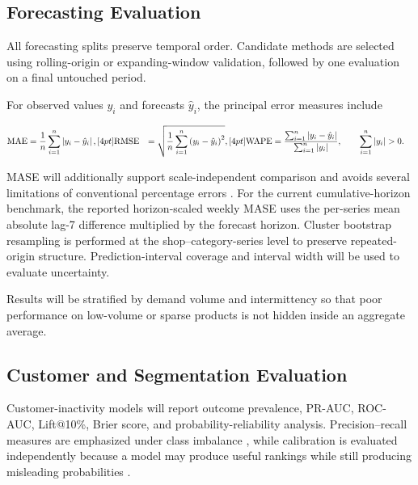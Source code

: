 \documentclass[a4paper,11pt,oneside]{book}
\theoremstyle{plain}
\theoremstyle{definition}
\theoremstyle{remark}
\let\\\space
\begin{document}
\subsection{Forecasting Evaluation}
\label{subsec:forecasting_evaluation}

All forecasting splits preserve temporal order. Candidate methods are selected
using rolling-origin or expanding-window validation, followed by one evaluation
on a final untouched period.

For observed values \(y_i\) and forecasts \(\hat{y}_i\), the principal error
measures include

\begin{align}
\mathrm{MAE}
&=
\frac{1}{n}
\sum_{i=1}^{n}
\left|y_i-\hat{y}_i\right|,
\\[4pt]
\mathrm{RMSE}
&=
\sqrt{
\frac{1}{n}
\sum_{i=1}^{n}
\left(y_i-\hat{y}_i\right)^2
},
\\[4pt]
\mathrm{WAPE}
&=
\frac{
\sum_{i=1}^{n}
\left|y_i-\hat{y}_i\right|
}{
\sum_{i=1}^{n}
\left|y_i\right|
},
\qquad
\sum_{i=1}^{n}|y_i|>0.
\end{align}

MASE will additionally support scale-independent comparison and avoids several
limitations of conventional percentage errors
\cite{hyndman2006accuracy}. For the current cumulative-horizon benchmark, the
reported horizon-scaled weekly MASE uses the per-series mean absolute lag-7
difference multiplied by the forecast horizon. Cluster bootstrap resampling
is performed at the shop--category-series level to preserve repeated-origin
structure. Prediction-interval coverage and interval width will be used to
evaluate uncertainty.

Results will be stratified by demand volume and intermittency so that poor
performance on low-volume or sparse products is not hidden inside an aggregate
average.


\subsection{Customer and Segmentation Evaluation}
\label{subsec:customer_segmentation_evaluation}

Customer-inactivity models will report outcome prevalence, PR-AUC, ROC-AUC,
Lift@10\%, Brier score, and probability-reliability analysis. Precision--recall
measures are emphasized under class imbalance
\cite{saito2015pr}, while calibration is evaluated independently because a model
may produce useful rankings while still producing misleading probabilities
\cite{niculescu2005calibration}.
\end{document}
